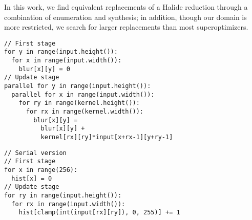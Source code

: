 In this work, we find equivalent replacements of a Halide reduction through a combination of enumeration and synthesis; in addition, though our domain is more restricted, we search for larger replacements than most superoptimizers.

\begin{lstlisting}[caption={Convolution blur kernel is easily parallelizable across \code{Var} $x$ adn $y$}, label={lst:blur_loopness}]
// First stage
for y in range(input.height()):
  for x in range(input.width()):
    blur[x][y] = 0
// Update stage
parallel for y in range(input.height()):
  parallel for x in range(input.width()):
    for ry in range(kernel.height()):
      for rx in range(kernel.width()):    
        blur[x][y] = 
          blur[x][y] + 
          kernel[rx][ry]*input[x+rx-1][y+ry-1] 
\end{lstlisting}

\begin{lstlisting}[caption={Histogram of an image is hard to parallelize since its update stage does not involve \code{RVar}s}, label={lst:histogram_loopness}]
// Serial version
// First stage
for x in range(256):
  hist[x] = 0
// Update stage
for ry in range(input.height()):
  for rx in range(input.width()):
    hist[clamp(int(input[rx][ry]), 0, 255)] += 1
\end{lstlisting}
